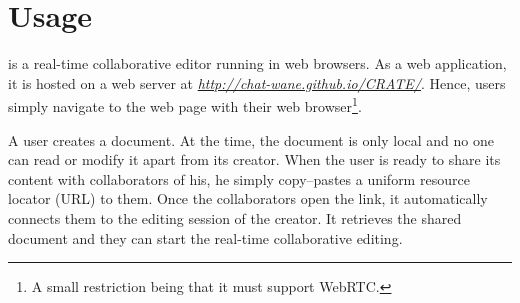 
\section{Usage}

\CRATE is a real-time collaborative editor running in web browsers. As a web
application, it is hosted on a web server at
\emph{\url{http://chat-wane.github.io/CRATE/}}. Hence, users simply navigate to
the web page with their web browser\footnote{A small restriction being that it
  must support WebRTC.}.

A user creates a document. At the time, the document is only local and no one
can read or modify it apart from its creator. When the user is ready to share
its content with collaborators of his, he simply copy--pastes a uniform resource
locator (URL) to them. Once the collaborators open the link, it automatically
connects them to the editing session of the creator. It retrieves the shared
document and they can start the real-time collaborative editing.